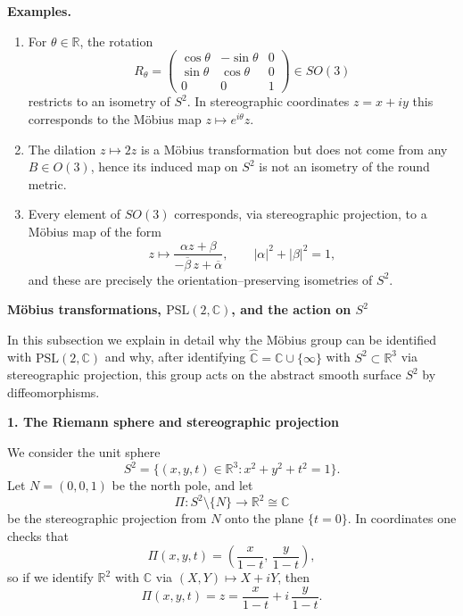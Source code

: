 \begin{solution}
	\par\medskip\noindent\textbf{Examples.}\par\smallskip

	
	\begin{enumerate}
		\item For $\theta\in\mathbb{R}$, the rotation
		\[
		R_\theta = \begin{pmatrix}
			\cos\theta & -\sin\theta & 0\\
			\sin\theta & \cos\theta & 0\\
			0          & 0          & 1
		\end{pmatrix}\in SO(3)
		\]
		restricts to an isometry of $S^{2}$. In stereographic coordinates $z=x+iy$ this corresponds
		to the M\"obius map $z\mapsto e^{i\theta}z$.
		\item The dilation $z\mapsto 2z$ is a M\"obius transformation but does not come from any
		$B\in O(3)$, hence its induced map on $S^{2}$ is not an isometry of the round metric.
		\item Every element of $SO(3)$ corresponds, via stereographic projection, to a M\"obius map of the form
		\[
		z\longmapsto \frac{\alpha z+\beta}{-\overline{\beta}\,z+\overline{\alpha}},\qquad
		|\alpha|^{2}+|\beta|^{2}=1,
		\]
		and these are precisely the orientation--preserving isometries of $S^{2}$.
	\end{enumerate}
	
	\par\medskip\noindent\textbf{M\"{o}bius transformations, \texorpdfstring{$\mathrm{PSL}(2,\mathbb{C})$}{PSL(2,C)}, and the action on $S^{2}$}\par\smallskip

	
	In this subsection we explain in detail why the M\"{o}bius group can be identified
	with $\mathrm{PSL}(2,\mathbb{C})$ and why, after identifying
	$\widehat{\mathbb{C}} = \mathbb{C}\cup\{\infty\}$ with $S^{2}\subset\mathbb{R}^3$
	via stereographic projection, this group acts on the abstract smooth surface
	$S^2$ by diffeomorphisms.
	
	\par\medskip\noindent\textbf{1. The Riemann sphere and stereographic projection}\par\smallskip

	
	We consider the unit sphere
	\[
	S^{2} = \{(x,y,t)\in\mathbb{R}^{3} : x^{2}+y^{2}+t^{2}=1\}.
	\]
	Let $N=(0,0,1)$ be the north pole, and let
	\[
	\Pi : S^{2}\setminus\{N\} \longrightarrow \mathbb{R}^{2}\cong\mathbb{C}
	\]
	be the stereographic projection from $N$ onto the plane $\{t=0\}$.  In
	coordinates one checks that
	\[
	\Pi(x,y,t) = \left( \frac{x}{1-t},\,\frac{y}{1-t} \right),
	\]
	so if we identify $\mathbb{R}^{2}$ with $\mathbb{C}$ via
	$(X,Y)\mapsto X+iY$, then
	\[
	\Pi(x,y,t) = z = \frac{x}{1-t} + i\,\frac{y}{1-t}.
	\]
	

\end{solution}
